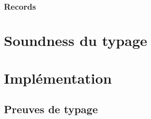 \documentclass[frenchb]{scrartcl}
\newcommand{\τ}{\ensuremath{\tau}}
\begin{document}
\subsubsection{Records}

\section{Soundness du typage}

\section{Implémentation}

\begin{appendices}
  \section{Preuves de typage}
\end{appendices}



\end{document}
